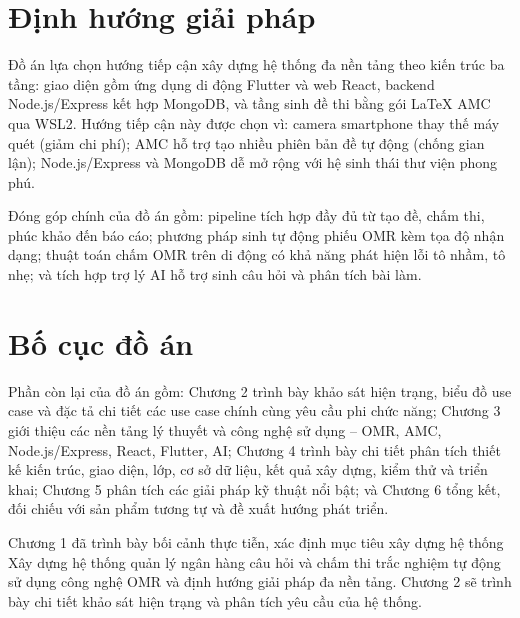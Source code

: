 ﻿\documentclass[../DoAn.tex]{subfiles}
\begin{document}
\section{Định hướng giải pháp}
\label{section:1.3}

Đồ án lựa chọn hướng tiếp cận xây dựng hệ thống đa nền tảng theo kiến trúc ba tầng: giao diện gồm ứng dụng di động Flutter và web React, backend Node.js/Express kết hợp MongoDB, và tầng sinh đề thi bằng gói LaTeX AMC qua WSL2. Hướng tiếp cận này được chọn vì: camera smartphone thay thế máy quét (giảm chi phí); AMC hỗ trợ tạo nhiều phiên bản đề tự động (chống gian lận); Node.js/Express và MongoDB dễ mở rộng với hệ sinh thái thư viện phong phú.

Đóng góp chính của đồ án gồm: pipeline tích hợp đầy đủ từ tạo đề, chấm thi, phúc khảo đến báo cáo; phương pháp sinh tự động phiếu OMR kèm tọa độ nhận dạng; thuật toán chấm OMR trên di động có khả năng phát hiện lỗi tô nhầm, tô nhẹ; và tích hợp trợ lý AI hỗ trợ sinh câu hỏi và phân tích bài làm.

\section{Bố cục đồ án}
\label{section:1.4}

Phần còn lại của đồ án gồm: Chương 2 trình bày khảo sát hiện trạng, biểu đồ use case và đặc tả chi tiết các use case chính cùng yêu cầu phi chức năng; Chương 3 giới thiệu các nền tảng lý thuyết và công nghệ sử dụng -- OMR, AMC, Node.js/Express, React, Flutter, AI; Chương 4 trình bày chi tiết phân tích thiết kế kiến trúc, giao diện, lớp, cơ sở dữ liệu, kết quả xây dựng, kiểm thử và triển khai; Chương 5 phân tích các giải pháp kỹ thuật nổi bật; và Chương 6 tổng kết, đối chiếu với sản phẩm tương tự và đề xuất hướng phát triển.

Chương 1 đã trình bày bối cảnh thực tiễn, xác định mục tiêu xây dựng hệ thống Xây dựng hệ thống quản lý ngân hàng câu hỏi và chấm thi trắc nghiệm tự động sử dụng công nghệ OMR và định hướng giải pháp đa nền tảng. Chương 2 sẽ trình bày chi tiết khảo sát hiện trạng và phân tích yêu cầu của hệ thống.
\end{document}
